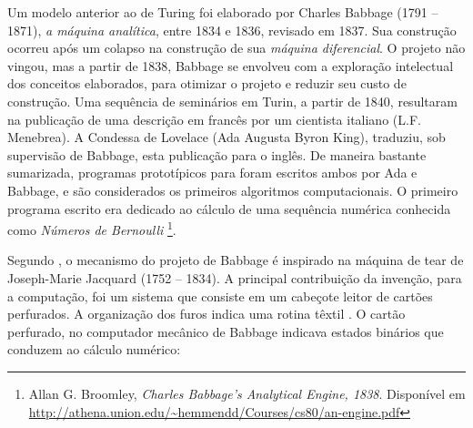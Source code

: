  Um modelo anterior ao de Turing foi elaborado por Charles Babbage (1791 -- 1871), \emph{a máquina analítica},  entre 1834 e 1836, revisado em 1837. Sua construção ocorreu após um colapso na construção de sua \emph{máquina diferencial}. O projeto não vingou, mas a partir de 1838, Babbage se envolveu com a exploração intelectual dos conceitos elaborados, para otimizar o projeto e reduzir seu custo de construção. Uma sequência de seminários em Turin, a partir de 1840, resultaram na publicação de uma descrição em francês por um cientista italiano (L.F. Menebrea). A Condessa de Lovelace (Ada Augusta Byron King), traduziu, sob supervisão de Babbage, esta publicação para o inglês. De maneira bastante sumarizada, programas prototípicos para foram escritos ambos por Ada e Babbage, e são considerados os primeiros algoritmos computacionais. O primeiro programa escrito era dedicado ao cálculo de uma sequência numérica conhecida como \emph{Números de Bernoulli} \footnote{Allan G. Broomley, \emph{Charles Babbage’s Analytical Engine, 1838}. Disponível em \url{http://athena.union.edu/~hemmendd/Courses/cs80/an-engine.pdf}}.

Segundo , o mecanismo do projeto de Babbage é inspirado na máquina de tear de Joseph-Marie Jacquard (1752 -- 1834). A principal contribuição da invenção, para a computação, foi um sistema que consiste em um cabeçote leitor de cartões perfurados. A organização dos furos indica uma rotina têxtil . O cartão perfurado, no computador mecânico de Babbage indicava estados binários que conduzem ao cálculo numérico:

\begin{citacao}
\end{citacao}

